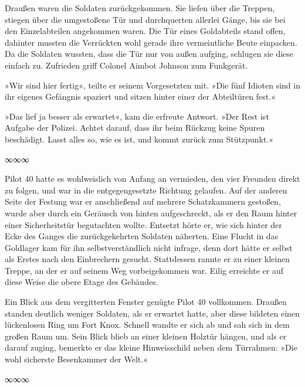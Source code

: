 Draußen waren die Soldaten zurückgekommen. Sie liefen über die Treppen, stiegen über die umgestoßene Tür und durchquerten allerlei Gänge, bis sie bei den Einzelabteilen angekommen waren. Die Tür eines Goldabteils stand offen, dahinter mussten die Verrückten wohl gerade ihre vermeintliche Beute einpacken. Da die Soldaten wussten, dass die Tür nur von außen aufging, schlugen sie diese einfach zu. Zufrieden griff Colonel Aimbot Johnson zum Funkgerät.

»Wir sind hier fertig«, teilte er seinem Vorgesetzten mit. »Die fünf Idioten sind in ihr eigenes Gefängnis spaziert und sitzen hinter einer der Abteiltüren fest.«

»Das lief ja besser als erwartet«, kam die erfreute Antwort. »Der Rest ist Aufgabe der Polizei. Achtet darauf, dass ihr beim Rückzug keine Spuren beschädigt. Lasst alles so, wie es ist, und kommt zurück zum Stützpunkt.«

\begin{center}
    ∞∞∞
\end{center}

Pilot 40 hatte es wohlweislich von Anfang an vermieden, den vier Freunden direkt zu folgen, und war in die entgegengesetzte Richtung gelaufen. Auf der anderen Seite der Festung war er anschließend auf mehrere Schatzkammern gestoßen, wurde aber durch ein Geräusch von hinten aufgeschreckt, als er den Raum hinter einer Sicherheitstür begutachten wollte. Entsetzt hörte er, wie sich hinter der Ecke des Ganges die zurückgekehrten Soldaten näherten. Eine Flucht in das Goldlager kam für ihn selbstverständlich nicht infrage, denn dort hätte er selbst als Erstes nach den Einbrechern gesucht. Stattdessen rannte er zu einer kleinen Treppe, an der er auf seinem Weg vorbeigekommen war. Eilig erreichte er auf diese Weise die obere Etage des Gebäudes.

Ein Blick aus dem vergitterten Fenster genügte Pilot 40 vollkommen. Draußen standen deutlich weniger Soldaten, als er erwartet hatte, aber diese bildeten einen lückenlosen Ring um Fort Knox. Schnell wandte er sich ab und sah sich in dem großen Raum um. Sein Blick blieb an einer kleinen Holztür hängen, und als er darauf zuging, bemerkte er das kleine Hinweisschild neben dem Türrahmen: »Die wohl sicherste Besenkammer der Welt.«

\begin{center}
    ∞∞∞
\end{center}

